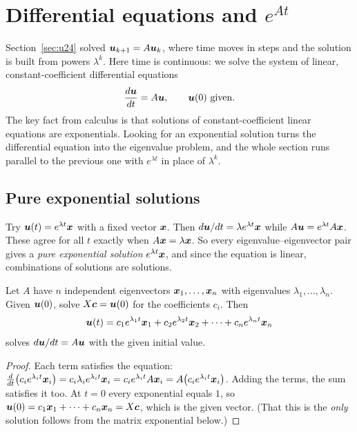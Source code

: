 \section{Differential equations and \texorpdfstring{\(e^{At}\)}{exp(At)}}\label{sec:u25}

Section~\ref{sec:u24} solved $\boldsymbol{u}_{k+1}=A\boldsymbol{u}_k$, where time moves in steps and the
solution is built from powers $\lambda^{k}$. Here time is continuous: we solve the system of
linear, constant-coefficient differential equations
\[
  \frac{d\vb{u}}{dt}=A\vb{u},\qquad \vb{u}(0)\ \text{given}.
\]
The key fact from calculus is that solutions of constant-coefficient linear equations are
exponentials. Looking for an exponential solution turns the differential equation into the
eigenvalue problem, and the whole section runs parallel to the previous one with
$e^{\lambda t}$ in place of $\lambda^{k}$.

\subsection{Pure exponential solutions}

Try $\boldsymbol{u}(t)=e^{\lambda t}\boldsymbol{x}$ with a fixed vector $\boldsymbol{x}$. Then
$d\boldsymbol{u}/dt=\lambda e^{\lambda t}\boldsymbol{x}$ while $A\boldsymbol{u}=e^{\lambda t}A\boldsymbol{x}$. These agree
for all $t$ exactly when $A\boldsymbol{x}=\lambda\boldsymbol{x}$. So every eigenvalue--eigenvector pair gives
a \emph{pure exponential solution} $e^{\lambda t}\boldsymbol{x}$, and since the equation is linear,
combinations of solutions are solutions.

\begin{theorem}\label{thm:u25-solution}
Let $A$ have $n$ independent eigenvectors $\boldsymbol{x}_1,\dots,\boldsymbol{x}_n$ with eigenvalues
$\lambda_1,\dots,\lambda_n$. Given $\boldsymbol{u}(0)$, solve $X\boldsymbol{c}=\boldsymbol{u}(0)$ for the coefficients
$c_i$. Then
\[
  \boldsymbol{u}(t)=c_1e^{\lambda_1t}\boldsymbol{x}_1+c_2e^{\lambda_2t}\boldsymbol{x}_2+\dots+c_ne^{\lambda_nt}\boldsymbol{x}_n
\]
solves $d\boldsymbol{u}/dt=A\boldsymbol{u}$ with the given initial value.
\end{theorem}

\begin{proof}
Each term satisfies the equation:
$\frac{d}{dt}\bigl(c_ie^{\lambda_it}\boldsymbol{x}_i\bigr)=c_i\lambda_ie^{\lambda_it}\boldsymbol{x}_i
=c_ie^{\lambda_it}A\boldsymbol{x}_i=A\bigl(c_ie^{\lambda_it}\boldsymbol{x}_i\bigr)$. Adding the terms, the sum
satisfies it too. At $t=0$ every exponential equals $1$, so
$\boldsymbol{u}(0)=c_1\boldsymbol{x}_1+\dots+c_n\boldsymbol{x}_n=X\boldsymbol{c}$, which is the given vector. (That this is
the \emph{only} solution follows from the matrix exponential below.)
\end{proof}

